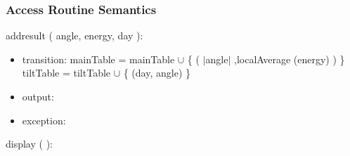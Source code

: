 \documentclass[12pt, titlepage]{article}
\begin{document}
\subsubsection{ Access Routine Semantics}

\noindent  addresult ( angle, energy, day ):
\begin{itemize}
\item transition: mainTable = mainTable $\cup$ \{ ( $|$angle$|$ ,localAverage (energy) )  \}\\
tiltTable = tiltTable $\cup$ \{ (day, angle) \}
\item output:
\item exception: 
\end{itemize}


\noindent  display ( ):
\end{document}
